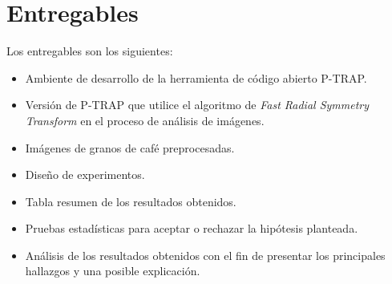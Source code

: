 \section{\textbf{Entregables}}\label{entregables}
Los entregables son los siguientes:
\begin{itemize}
\item Ambiente de desarrollo de la herramienta de c\'odigo abierto P-TRAP\cite{ptrap}.
\item Versi\'on de P-TRAP\cite{ptrap} que utilice el algoritmo de \textit{Fast Radial Symmetry Transform}\cite{loyzelinsky} en el proceso de an\'alisis de im\'agenes.
\item Im\'agenes de granos de caf\'e preprocesadas.
\item Dise\~no de experimentos.
\item Tabla resumen de los resultados obtenidos.
\item Pruebas estad\'isticas para aceptar o rechazar la hip\'otesis planteada.
\item An\'alisis de los resultados obtenidos con el fin de presentar los principales hallazgos y una posible explicaci\'on.
\end{itemize}

